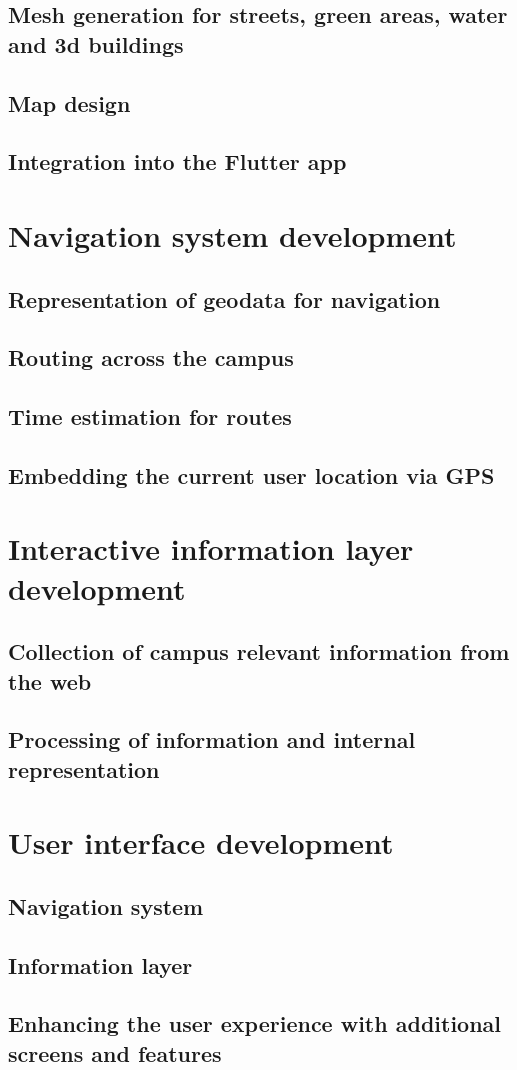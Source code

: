 \subsection{Mesh generation for streets, green areas, water and 3d buildings}
\subsection{Map design}
\subsection{Integration into the Flutter app}

\section{Navigation system development}
\subsection{Representation of geodata for navigation}
\subsection{Routing across the campus}
\subsection{Time estimation for routes}
\subsection{Embedding the current user location via GPS}

\section{Interactive information layer development}
\subsection{Collection of campus relevant information from the web}
\subsection{Processing of information and internal representation}

\section{User interface development}
\subsection{Navigation system}
\subsection{Information layer}
\subsection{Enhancing the user experience with additional screens and features}